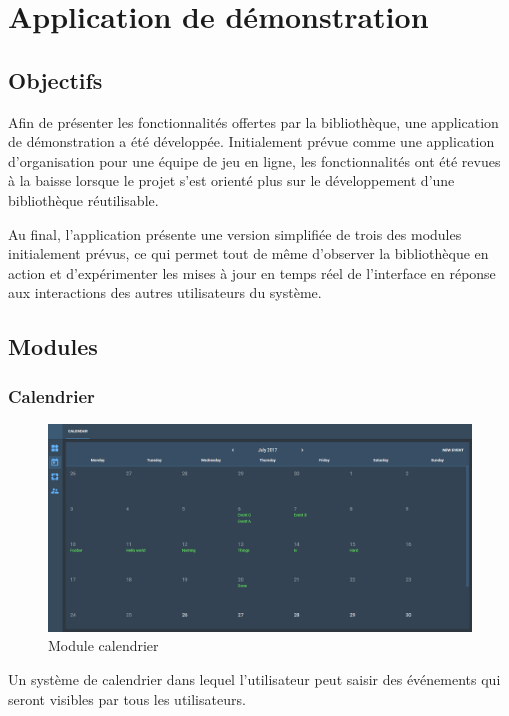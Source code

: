 \chapter{Application de démonstration}

\section{Objectifs}

Afin de présenter les fonctionnalités offertes par la bibliothèque, une application de démonstration a été développée. Initialement prévue comme une application d'organisation pour une équipe de jeu en ligne, les fonctionnalités ont été revues à la baisse lorsque le projet s'est orienté plus sur le développement d'une bibliothèque réutilisable.

Au final, l'application présente une version simplifiée de trois des modules initialement prévus, ce qui permet tout de même d'observer la bibliothèque en action et d'expérimenter les mises à jour en temps réel de l'interface en réponse aux interactions des autres utilisateurs du système.

\section{Modules}

	\subsection{Calendrier}
	\begin{figure}[h]
		\centering
		\includegraphics[width=12cm]{img/calendar}
		\caption{Module calendrier}
	\end{figure}
	
	Un système de calendrier dans lequel l'utilisateur peut saisir des événements qui seront visibles par tous les utilisateurs.
	
